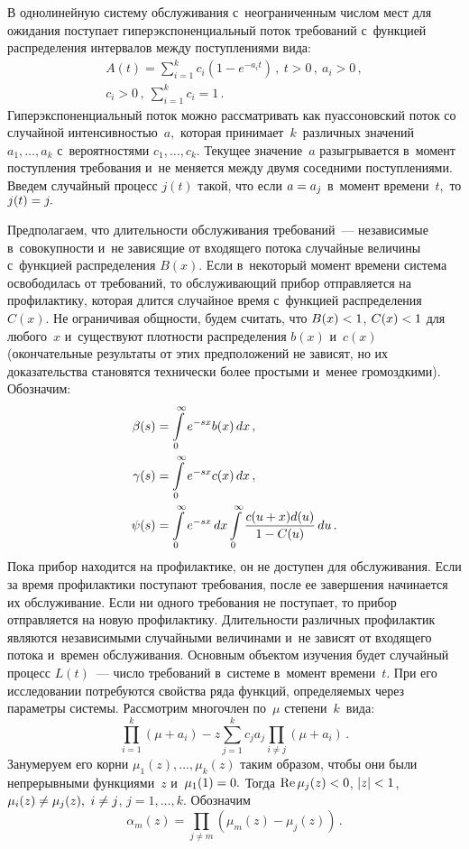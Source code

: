 \begin{multicols}{2}
В однолинейную систему обслуживания с~неограниченным числом мест для ожидания 
поступает гиперэкспоненциальный поток требований с~функцией распределения 
интервалов между поступлениями вида:
\begin{multline*}
A(t)=\sum\limits_{i=1}^k c_i\left(1-e^{-a_it}\right)\,,\ t>0\,,\ 
a_i>0\,,\\
 c_i>0\,,\ \sum\limits_{i=1}^kc_i=1\,.
\end{multline*}
Гиперэкспоненциальный поток можно рассматривать как пуассоновский поток 
со случайной интенсивностью~$a,$ которая принимает~$k$~различных значений 
$a_1,\ldots,a_k$  с~вероятностями $c_1,\ldots,c_k.$ Текущее значение~$a$ 
разыгрывается в~момент поступления требования и~не меняется между двумя 
соседними поступлениями. Введем случайный процесс $j(t)$ такой, что если $a\hm=a_j$ 
в~момент времени~$t,$ то $j(t)\hm=j.$
{

}

Предполагаем, что длительности обслуживания требований~--- независимые в~совокупности 
и~не зависящие от входящего потока случайные величины с~функцией распределения $B(x).$
 Если в~некоторый момент времени система освободилась от требований, то обслуживающий 
 прибор отправляется на профилактику, которая длится случайное время с~функцией 
 распределения $C(x).$ Не ограничивая общности, будем считать, что $B(x)\hm<1$, $C(x)\hm<1$  
 для любого~$x$ и~существуют плотности распределения $b(x)$ и~$c(x)$  
 (окончательные результаты от этих предположений не зависят, но их 
 доказательства становятся технически более простыми и~менее громоздкими). Обозначим:
\begin{align*}
  \beta(s)&=\int\limits_0^{\infty}e^{-sx}b(x)\,dx\,,\\  
  \gamma(s)&=\int\limits_0^{\infty}e^{-sx}c(x)\,dx\,,\\ 
  \psi(s)&=\int\limits_0^{\infty}e^{-sx}\,dx
  \int\limits_0^{\infty}\displaystyle\frac{\displaystyle c(u+x)d(u)\mathstrut}{\displaystyle 1-C(u)\mathstrut}\,du\,.
  \end{align*}
  Пока прибор находится на профилактике, он не доступен для обслуживания. 
  Если за время профилактики поступают требования, после ее завершения 
  начинается их обслуживание. Если ни одного требования не поступает, 
  то прибор отправляется на новую профилактику. Длительности различных 
  профилактик являются независимыми случайными величинами и~не зависят 
  от входящего потока и~времен обслуживания.
  Основным объектом изучения будет случайный процесс $L(t)$~--- число требований 
  в~системе в~момент времени~$t.$ При его исследовании  потребуются свойства ряда 
  функций, определяемых через параметры системы. Рас\-смот\-рим многочлен по~$\mu$ 
  степени~$k$~вида:
\begin{equation}
\label{1-u}
\prod\limits_{i=1}^k\left(\mu+a_i\right)-z\sum\limits_{j=1}^kc_ja_j\prod\limits_{i\ne j}
\left(\mu+a_i\right)\,.
\end{equation}
Занумеруем его корни $\mu_1(z),\ldots,\mu_k(z)$ таким образом, чтобы они были 
непрерывными функциями~$z$ и~$\mu_1(1)\hm=0.$ Тогда  $\mathrm{Re}\, \mu_j(z)\hm<0$, 
$|z|\hm<1$,  $\mu_i(z)\hm\ne \mu_j(z),$ $ i\hm\ne j$, $j=1,\ldots,k.$
Обозначим
$$
\alpha_m(z)=\prod\limits_{j\ne m}\left(\mu_m(z)-\mu_j(z)\right)\,.
$$


\end{multicols}
